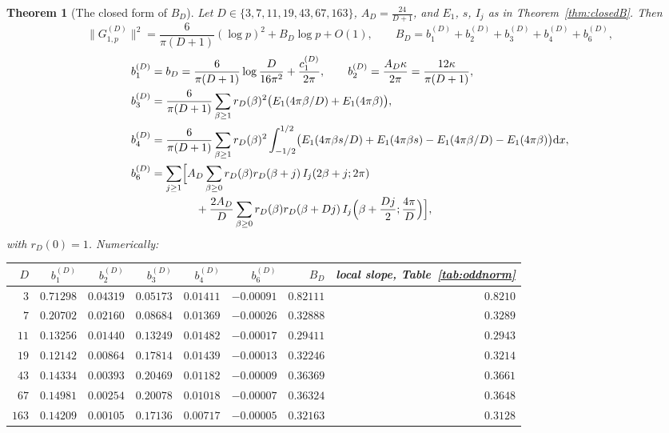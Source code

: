 \documentclass[11pt]{amsart}
\newtheorem{theorem}{Theorem}[section]
\theoremstyle{remark}
\newcommand{\dd}{\mathrm{d}}
\begin{document}
\begin{theorem}[The closed form of $B_D$]\label{thm:closedBD}
Let $D\in\{3,7,11,19,43,67,163\}$, $A_D=\frac{24}{D+1}$, and $E_1$, $s$, $I_j$ as in Theorem~\ref{thm:closedB}. Then
\[
\|G^{(D)}_{1,p}\|^2=\frac6{\pi(D+1)}(\log p)^2+B_D\log p+O(1),\qquad B_D=b_1^{(D)}+b_2^{(D)}+b_3^{(D)}+b_4^{(D)}+b_6^{(D)},
\]
\begin{align*}
b_1^{(D)}&=b_D=\frac{6}{\pi(D+1)}\log\frac D{16\pi^2}+\frac{c_1^{(D)}}{2\pi},\qquad b_2^{(D)}=\frac{A_D\kappa}{2\pi}=\frac{12\kappa}{\pi(D+1)},\\
b_3^{(D)}&=\frac6{\pi(D+1)}\sum_{\beta\ge1}r_D(\beta)^2\bigl(E_1(4\pi\beta/D)+E_1(4\pi\beta)\bigr),\\
b_4^{(D)}&=\frac6{\pi(D+1)}\sum_{\beta\ge1}r_D(\beta)^2\int_{-1/2}^{1/2}\bigl(E_1(4\pi\beta s/D)+E_1(4\pi\beta s)-E_1(4\pi\beta/D)-E_1(4\pi\beta)\bigr)\dd x,\\
b_6^{(D)}&=\sum_{j\ge1}\Bigl[A_D\sum_{\beta\ge0}r_D(\beta)r_D(\beta+j)\,I_j(2\beta+j;2\pi)\\
&\hskip4em+\frac{2A_D}D\sum_{\beta\ge0}r_D(\beta)r_D(\beta+Dj)\,I_j\Bigl(\beta+\frac{Dj}2;\frac{4\pi}D\Bigr)\Bigr],
\end{align*}
with $r_D(0)=1$. Numerically:
\begin{center}\footnotesize\setlength{\tabcolsep}{5pt}
\begin{tabular}{r|rrrrr|r|r}
\toprule
$D$ & $b_1^{(D)}$ & $b_2^{(D)}$ & $b_3^{(D)}$ & $b_4^{(D)}$ & $b_6^{(D)}$ & $B_D$ & local slope, Table~\ref{tab:oddnorm}\\
\midrule
$3$ & $0.71298$ & $0.04319$ & $0.05173$ & $0.01411$ & $-0.00091$ & $0.82111$ & $0.8210$\\
$7$ & $0.20702$ & $0.02160$ & $0.08684$ & $0.01369$ & $-0.00026$ & $0.32888$ & $0.3289$\\
$11$ & $0.13256$ & $0.01440$ & $0.13249$ & $0.01482$ & $-0.00017$ & $0.29411$ & $0.2943$\\
$19$ & $0.12142$ & $0.00864$ & $0.17814$ & $0.01439$ & $-0.00013$ & $0.32246$ & $0.3214$\\
$43$ & $0.14334$ & $0.00393$ & $0.20469$ & $0.01182$ & $-0.00009$ & $0.36369$ & $0.3661$\\
$67$ & $0.14981$ & $0.00254$ & $0.20078$ & $0.01018$ & $-0.00007$ & $0.36324$ & $0.3648$\\
$163$ & $0.14209$ & $0.00105$ & $0.17136$ & $0.00717$ & $-0.00005$ & $0.32163$ & $0.3128$\\
\bottomrule
\end{tabular}
\end{center}
\end{theorem}
\end{document}
